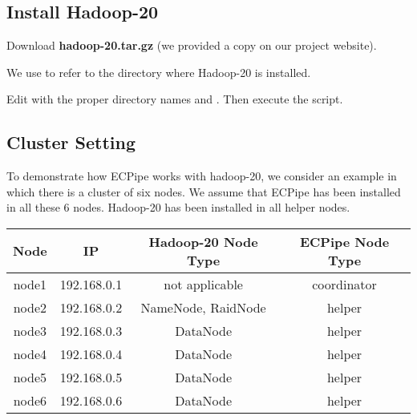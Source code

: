 \documentclass[letterpaper,12pt]{article}
\newcommand{\sysname}{{\sf\small ECPipe}\xspace}
\begin{document}
\subsection{Install Hadoop-20}

Download {\bf hadoop-20.tar.gz} (we provided a copy on our project website).

\begin{center}
\noindent{}
\end{center}

We use  to refer to the directory where Hadoop-20 is
installed.

\begin{center}
\noindent{}
\end{center}



Edit  with the proper directory
names  and .  Then execute the script.

\begin{center}
\noindent{}
\end{center}

\subsection{Cluster Setting}

To demonstrate how ECPipe works with hadoop-20, we consider an example in
which there is a cluster of six nodes.  We assume that \sysname has been
installed in all these 6 nodes.  Hadoop-20 has been installed in all helper
nodes.

\begin{center}
  \begin{tabular}{|c|c|c|c|}
    \hline
    {\bf Node} & {\bf IP} & {\bf Hadoop-20 Node Type} & {\bf ECPipe Node Type} \\
    \hline
    node1 & 192.168.0.1 & not applicable &  coordinator \\
    \hline
    node2 & 192.168.0.2 & NameNode, RaidNode &  helper \\
    \hline
    node3 & 192.168.0.3 & DataNode & helper \\
    \hline
    node4 & 192.168.0.4 & DataNode & helper \\
    \hline
    node5 & 192.168.0.5 & DataNode & helper \\
    \hline
    node6 & 192.168.0.6 & DataNode & helper \\
    \hline
    \end{tabular}
\end{center}
\end{document}
